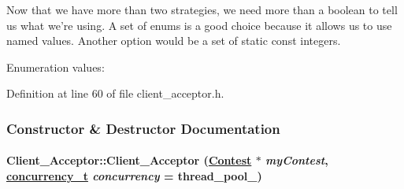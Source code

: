 Now that we have more than two strategies, we need more than a boolean to tell us what we're using. A set of enums is a good choice because it allows us to use named values. Another option would be a set of static const integers. \begin{Desc}
\item[Enumeration values: ]\par
\begin{description}
\item[{\em 
\hypertarget{classClient__Acceptor_Client__Acceptors4Client__Acceptors1}{
{\em single\_\-threaded\_\-}}
\label{classClient__Acceptor_Client__Acceptors4Client__Acceptors1}
}]\item[{\em 
\hypertarget{classClient__Acceptor_Client__Acceptors4Client__Acceptors2}{
{\em thread\_\-per\_\-connection\_\-}}
\label{classClient__Acceptor_Client__Acceptors4Client__Acceptors2}
}]\item[{\em 
\hypertarget{classClient__Acceptor_Client__Acceptors4Client__Acceptors3}{
{\em thread\_\-pool\_\-}}
\label{classClient__Acceptor_Client__Acceptors4Client__Acceptors3}
}]\end{description}
\end{Desc}



Definition at line 60 of file client\_\-acceptor.h.

\subsubsection{Constructor \& Destructor Documentation}
\hypertarget{classClient__Acceptor_Client__Acceptora0}{
\paragraph[Client\_\-Acceptor]{\setlength{\rightskip}{0pt plus 5cm}Client\_\-Acceptor::Client\_\-Acceptor (\hyperlink{classContest}{Contest} $\ast$ {\em my\-Contest}, \hyperlink{classClient__Acceptor_Client__Acceptors4}{concurrency\_\-t} {\em concurrency} = thread\_\-pool\_\-)}\hfill}
\label{classClient__Acceptor_Client__Acceptora0}


